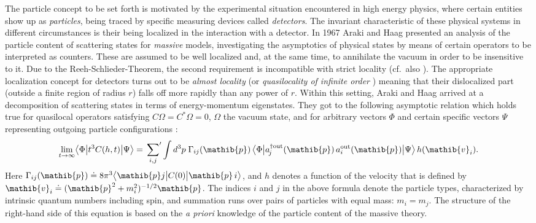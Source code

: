 \documentclass[a4paper,a4paper]{article}
\numberwithin{equation}{section}
\newcommand{\pib}{\mathib{p}}
\newcommand{\vib}{\mathib{v}}
\theoremstyle{definition}
\theoremstyle{plain}
\theoremstyle{remark}
\newcommand{\bscpx}[3]{\bigl\langle #1 \big\vert #2 \big\vert #3
  \bigr\rangle}
\begin{document}
  The particle concept to be set forth is motivated by the
  experimental situation encountered in high energy physics, where
  certain entities show up as \emph{particles}, being traced by
  specific measuring devices called \emph{detectors}. The invariant
  characteristic of these physical systems in different circumstances
  is their being localized in the interaction with a detector. In 1967
  Araki and Haag \cite{araki/haag:1967} presented an analysis of the
  particle content of scattering states for \emph{massive} models,
  investigating the asymptotics of physical states by means of certain
  operators to be interpreted as counters. These are assumed to be
  well localized and, at the same time, to annihilate the vacuum in
  order to be insensitive to it.  Due to the Reeh-Schlieder-Theorem,
  the second requirement is incompatible with strict locality
  \cite{reeh/schlieder:1961} (cf.~also
  \cite[Theorem~5.3.2]{haag:1996}). The appropriate localization
  concept for detectors turns out to be \emph{almost locality} (or
  \emph{quasilocality of infinite order} \cite{araki/haag:1967})
  meaning that their dislocalized part (outside a finite region of
  radius $r$) falls off more rapidly than any power of $r$. Within
  this setting, Araki and Haag arrived at a decomposition of
  scattering states in terms of energy-momentum eigenstates. They got
  to the following asymptotic relation which holds true for quasilocal
  operators satisfying $C \Omega = C^* \Omega = 0$, $\Omega$ the
  vacuum state, and for arbitrary vectors $\Phi$ and certain specific
  vectors $\Psi$ representing outgoing particle configurations
  \cite[Theorem~4]{araki/haag:1967}:
  \begin{equation}
    \label{eq:araki/haag-result}
    \lim_{t \rightarrow \infty} \bscpx{\Phi}{t^3 C ( h , t )}{\Psi} =
    \sideset{}{'} \sum_{i , j} \int d^3 p \; \Gamma_{i j} ( \pib ) \,
    \bscpx{\Phi}{a_{\! j}^{\dagger \text{out}} ( \pib ) \,
    a_i^{\text{out}} ( \pib )}{\Psi} \, h ( \vib_i ) \text{.}
  \end{equation}
  Here $\Gamma_{i j} ( \pib ) \doteq 8 \pi^3 \bscpx{\pib j}{C ( 0
  )}{\pib \, i}$, and $h$ denotes a function of the velocity that is
  defined by $\vib_i \doteq ( \pib^2 + m_i^2 )^{-1/2} \pib$. The
  indices $i$ and $j$ in the above formula denote the particle types,
  characterized by intrinsic quantum numbers including spin, and
  summation runs over pairs of particles with equal mass: $m_i = m_j$.
  The structure of the right-hand side of this equation is based on
  the \emph{a priori} knowledge of the particle content of the massive
  theory.
  
\end{document}
